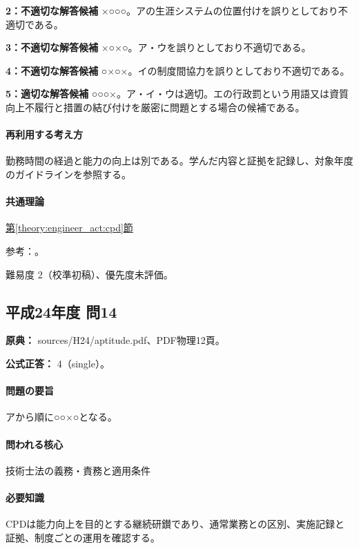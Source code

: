 \noindent\textbf{2：不適切な解答候補} ×○○○。アの生涯システムの位置付けを誤りとしており不適切である。\par

\noindent\textbf{3：不適切な解答候補} ×○×○。ア・ウを誤りとしており不適切である。\par

\noindent\textbf{4：不適切な解答候補} ○×○×。イの制度間協力を誤りとしており不適切である。\par

\noindent\textbf{5：適切な解答候補} ○○○×。ア・イ・ウは適切。エの行政罰という用語又は資質向上不履行と措置の結び付けを厳密に問題とする場合の候補である。\par

\paragraph{再利用する考え方} 勤務時間の経過と能力の向上は別である。学んだ内容と証拠を記録し、対象年度のガイドラインを参照する。

\paragraph{共通理論} \hyperref[theory:engineer_act:cpd]{第\ref*{theory:engineer_act:cpd}節}

\par 参考：\cite{engineer_act_current,cpd_v1}。

\par 難易度 2（校準初稿）、優先度未評価。

\subsection{平成24年度 問14}
\label{q:h24-reg-apt-14}

\noindent\textbf{原典：} sources/H24/aptitude.pdf、PDF物理12頁。

\textbf{公式正答：} 4（single）。

\paragraph{問題の要旨} アから順に○○×○となる。

\paragraph{問われる核心} 技術士法の義務・責務と適用条件

\paragraph{必要知識} CPDは能力向上を目的とする継続研鑚であり、通常業務との区別、実施記録と証拠、制度ごとの運用を確認する。

